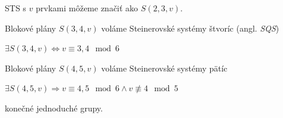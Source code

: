 \begin{remark}
STS s $v$ prvkami môžeme značiť ako $S(2,3,v)$.
\end{remark}

\begin{definition}
Blokové plány $S(3,4,v)$ voláme Steinerovské systémy štvoríc (angl. \emph{SQS})
\end{definition}

\begin{theorem_hard}

$\exists S(3,4,v) \Longleftrightarrow v \equiv 3,4 \mod 6$

\end{theorem_hard}


\begin{definition}
Blokové plány $S(4,5,v)$ voláme Steinerovské systémy pätíc
\end{definition}


\begin{theorem_hard}

$\exists S(4,5,v) \Longrightarrow v \equiv 4,5 \mod 6 \wedge v \not\equiv 4 \mod 5$

\end{theorem_hard}

\TODO konečné jednoduché grupy.
